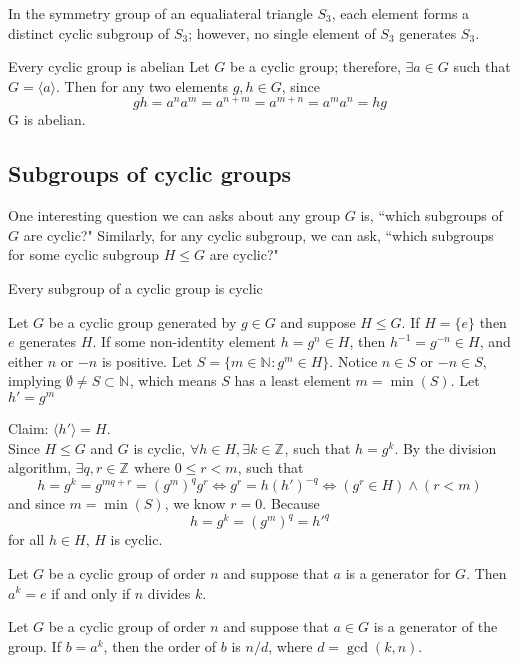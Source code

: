 \documentclass[11pt]{article} %
\newcommand\br{\vspace{15 pt}}
\newcommand\Z[1]{\text{$\mathbb{Z}^{#1}$}}
\newcommand\N[1]{\text{$\mathbb{N}^{#1}$}}
\newcommand\cyc[1]{\text{$\langle {#1} \rangle$}}
\newcommand\set[1]{\{#1\}}
\begin{document}
In the symmetry group of an equaliateral triangle $S_3$, each element forms a distinct cyclic subgroup of $S_3$; however, no single element of $S_3$ generates $S_3$.

\br 
\theorem{}
{Every cyclic group is abelian}
{
Let $G$ be a cyclic group; therefore, $\exists a \in G$ such that $G = \cyc a$. Then for any two elements $g, h \in G$, since
$$
gh = a^n a^m = a^{n+m} = a^{m+n} = a^m a^n = hg
$$
G is abelian.
}

\br

\subsection{Subgroups of cyclic groups}
One interesting question we can asks about any group $G$ is, ``which subgroups of $G$ are cyclic?" Similarly, for any cyclic subgroup, we can ask, ``which subgroups for some cyclic subgroup $H \leqslant G$ are cyclic?"

\theorem{}
{Every subgroup of a cyclic group is cyclic}
{
Let $G$ be a cyclic group generated by $g \in G$ and suppose $H \leqslant G$. If $H = \set e$ then $e$ generates $H$. If some non-identity element $h = g^n \in H$, then $h^{-1} = g^{-n} \in H$, and either $n$ or $-n$ is positive.  Let $S = \set{ m \in \N{} : g^m \in H}$. Notice $n \in S$ or $-n \in S$, implying $\emptyset \ne S \subset \N{}$, which means $S$ has a least element $m = \min (S)$. Let $h' = g^m$

Claim: $\cyc {h'} = H$.\\
Since $H \leqslant G$ and $G$ is cyclic, $\forall h \in H, \exists k \in \Z{}$, such that $h = g^k$. By the division algorithm, $\exists q, r \in \Z{}$ where $0 \le r < m$, such that
$$
h = g^k = g^{mq+r} = (g^m)^q g^r \iff g^r = h (h')^{-q} \iff (g^r \in H) \wedge (r < m)
$$
and since $m = \min (S)$, we know $r = 0$. Because
$$
h = g^k = (g^m)^q = h'^q
$$
for all $h \in H$, $H$ is cyclic.
}

\br

\theorem{}
{Let $G$ be a cyclic group of order $n$ and suppose that $a$ is a generator for $G$. Then $a^k = e$ if and only if $n$ divides $k$.}
{}

\br

\theorem{}
{Let $G$ be a cyclic group of order $n$ and suppose that $a \in G$ is a generator of the group. If $b = a^k$, then the order of $b$ is $n/d$, where $d = \gcd (k,n)$.
}
{}
\end{document}
